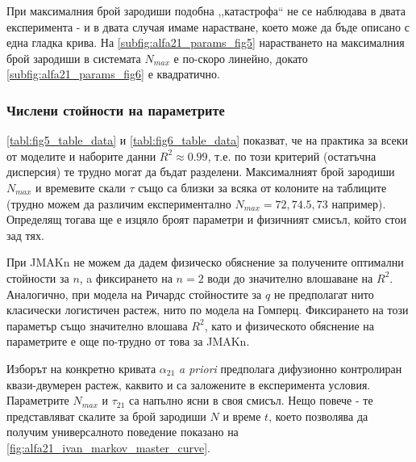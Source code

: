 При максималния брой зародиши подобна ,,катастрофа`` не се наблюдава в двата експеримента - и в двата случая имаме нарастване, което може да бъде описано с една гладка крива. На \autoref{subfig:alfa21_params_fig5} нарастването на максималния брой зародиши в системата $N_{max}$ е по-скоро линейно, докато \autoref{subfig:alfa21_params_fig6} е квадратично.

\subsubsection{Числени стойности на параметрите}
\autoref{tabl:fig5_table_data} и \autoref{tabl:fig6_table_data} показват, че на практика за всеки от моделите и наборите данни $R^2 \approx 0.99$, т.е. по този критерий (остатъчна дисперсия) те трудно могат да бъдат разделени. Максималният брой зародиши $N_{max}$ и времевите скали $\tau$ също са близки за всяка от колоните на таблиците (трудно можем да различим експериментално $N_{max} = 72, 74.5, 73$ например). Определящ тогава ще е изцяло броят параметри и физичният смисъл, който стои зад тях. 

При JMAKn не можем да дадем физическо обяснение за получените оптимални стойности за $n$, a фиксирането на $n = 2$ води до значително влошаване на $R^2$. Аналогично, при модела на Ричардс стойностите за $q$ не предполагат нито класически логистичен растеж, нито по модела на Гомперц. Фиксирането на този параметър също значително влошава $R^2$, като и физическото обяснение на параметрите е още по-трудно от това за JMAKn.

Изборът на конкретно кривата $\alpha_{21}$ \textit{a priori} предполага дифузионно контролиран квази-двумерен растеж, каквито и са заложените в експеримента условия. Параметрите $N_{max}$ и $\tau_{21}$ са напълно ясни в своя смисъл. Нещо повече - те представляват скалите за брой зародиши $N$ и време $t$, което позволява да получим универсалното поведение показано на \autoref{fig:alfa21_ivan_markov_master_curve}. 


